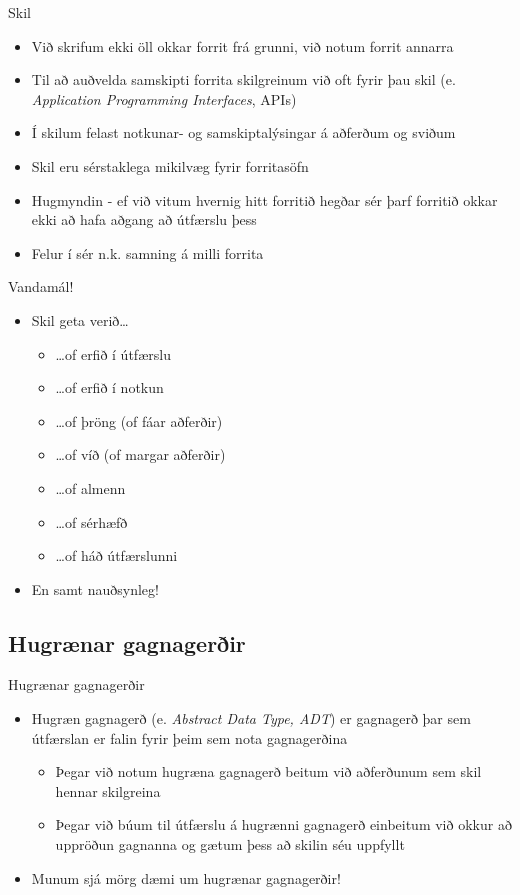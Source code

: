 \documentclass{beamer}
\begin{document}
\begin{frame}{Skil}
\begin{itemize}
 \item Við skrifum ekki öll okkar forrit frá grunni, við notum forrit annarra
 \item Til að auðvelda samskipti forrita skilgreinum við oft fyrir þau skil (e. \emph{Application Programming Interfaces}, APIs)
 \item Í skilum felast notkunar- og samskiptalýsingar á aðferðum og sviðum
 \item Skil eru sérstaklega mikilvæg fyrir forritasöfn
 \item Hugmyndin - ef við vitum hvernig hitt forritið hegðar sér þarf forritið okkar ekki að hafa aðgang að útfærslu þess
 \item Felur í sér n.k. samning á milli forrita
\end{itemize}
\end{frame}

\begin{frame}{Vandamál!}
\begin{itemize}
 \item Skil geta verið\ldots
 \begin{itemize}
  \item \ldots of erfið í útfærslu
  \item \ldots of erfið í notkun
  \item \ldots of þröng (of fáar aðferðir)
  \item \ldots of víð (of margar aðferðir)
  \item \ldots of almenn
  \item \ldots of sérhæfð
  \item \ldots of háð útfærslunni
 \end{itemize}
 \item En samt nauðsynleg!
\end{itemize}
\end{frame}

\subsection{Hugrænar gagnagerðir}

\begin{frame}{Hugrænar gagnagerðir}
\begin{itemize}
 \item Hugræn gagnagerð (e. \emph{Abstract Data Type, ADT}) er gagnagerð þar sem útfærslan er falin fyrir þeim sem nota gagnagerðina
 \begin{itemize}
  \item Þegar við notum hugræna gagnagerð beitum við aðferðunum sem skil hennar skilgreina
  \item Þegar við búum til útfærslu á hugrænni gagnagerð einbeitum við okkur að uppröðun gagnanna og gætum þess að skilin séu uppfyllt
 \end{itemize}
 \item Munum sjá mörg dæmi um hugrænar gagnagerðir!
\end{itemize}
\end{frame}
\end{document}
